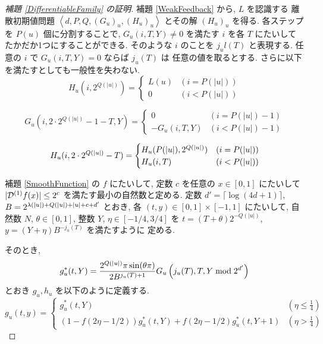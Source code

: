 \begin{proof}[\rm 補題 \ref{DifferentiableFamily} の証明]
 補題 \ref{WeakFeedback} から, $L$ を認識する 
 離散初期値問題 $\left< d, P, Q,(G_u)_u,(H_u)_u \right>$
 とその解 $(H_u)_u$ を得る.
 各ステップを $P(u)$ 個に分割することで, $G_u(i, T, Y) \not = 0$ を満たす
 $i$ を各 $T$ にたいしてたかだか1つにすることができる. そのような $i$ のことを 
 $j_ul(T)$ と表現する. 任意の $i$ で $G_u(i, T, Y) = 0$ ならば $j_u(T)$ は
 任意の値を取るとする. 
 さらに以下を満たすとしても一般性を失わない.
 \begin{equation}
  H_u(i, 2^{Q(|u|)}) = \begin{cases}
			L(u) & (i=P(|u|)) \\
			0 & (i<P(|u|))
		       \end{cases}
 \end{equation}

 \begin{equation}
  G_u(i, 2\cdot 2^{Q(|u|)} - 1 - T, Y) 
   = \begin{cases}
      0 & (i=P(|u|)-1) \\
      -G_u(i,T,Y) & (i<P(|u|)-1)
     \end{cases}
 \end{equation}

 \begin{equation}
  H_u(i, 2 \cdot 2^{Q(|u|)} - T) 
  = \begin{cases}
    H_u(P(|u|), 2^{Q(|u|)}) & (i={P(|u|)}) \\
    H_u(i, T) &  (i<P(|u|))
    \end{cases}
 \end{equation}

  補題 \ref{SmoothFunction} の $f$ にたいして, 
 定数 $c$ を任意の $x \in [0,1]$ にたいして $|\mathcal D^{(1)}f(x)| \le 2^c$ を満たす最小の自然数と定める.
 定数 $d' = \lceil \log (4d + 1) \rceil$, 
 $B = 2^{{\lambda(|u|)} + {Q(|u|)} + |u| + c + d'}$ とおき, 
 各 $(t, y) \in [0,1] \times [-1, 1]$ にたいして,
 自然数 $N$, $\theta \in [0,1]$, 整数 $Y$, $\eta \in [-1/4, 3/4]$ を
 $t = (T + \theta)2^{-Q(|u|)}$, $y = (Y + \eta)B^{-j_u(T)}$ を満たすように
 定める.
 
 そのとき,
 \begin{equation}
  g^*_u(t, Y) = \frac{2^{Q(|u|)} \pi \sin (\theta\pi)}{2B^{j_u(T)+1}} 
   G_u\left( j_u(T), T, Y \bmod 2^{d'} \right)
 \end{equation}
 とおき $g_u, h_u$ を以下のように定義する.
 \begin{equation}
  g_u(t,y) 
  = \begin{cases}
     g^*_u(t, Y)& (\eta \le \frac 1 4) \\
     ( 1-f ( 2\eta - 1/2)) g^*_u(t, Y) 
     + f ( 2\eta -  1/2) g^*_u(t, Y+1)
     & (\eta > \frac 1 4)
    \end{cases}
  \label{eq:gu}
 \end{equation}


\end{proof}
